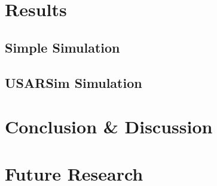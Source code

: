\documentclass[11pt]{article}
\begin{document}



\section{Results}
\label{sec:results}


\subsection{Simple Simulation}

\subsection{USARSim Simulation}




\section{Conclusion \& Discussion}
\label{sec:conclusion}



\section{Future Research}
\label{sec:future}





\end{document}
